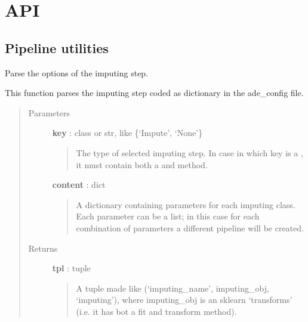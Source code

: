 \documentclass[letterpaper,10pt,english]{sphinxmanual}
\begin{document}
\section{API}
\label{index:api}\label{index:id1}

\subsection{Pipeline utilities}
\label{index:module-adenine.core.define_pipeline}\label{index:pipeline-utilities}

\begin{fulllineitems}
\label{index:adenine.core.define_pipeline.parse_imputing}
Parse the options of the imputing step.

This function parses the imputing step coded as dictionary in the
ade\_config file.
\begin{quote}\begin{description}
\item[{Parameters}] \leavevmode
\textbf{key} : class or str, like \{`Impute', `None'\}
\begin{quote}

The type of selected imputing step. In case in which key
is a , it must contain both a  and  method.
\end{quote}

\textbf{content} : dict
\begin{quote}

A dictionary containing parameters for each imputing
class. Each parameter can be a list; in this case for each combination
of parameters a different pipeline will be created.
\end{quote}

\item[{Returns}] \leavevmode
\textbf{tpl} : tuple
\begin{quote}

A tuple made like (`imputing\_name', imputing\_obj, `imputing'),
where imputing\_obj is an sklearn `transforms' (i.e. it has bot a fit
and transform method).
\end{quote}

\end{description}\end{quote}

\end{fulllineitems}
\end{document}
